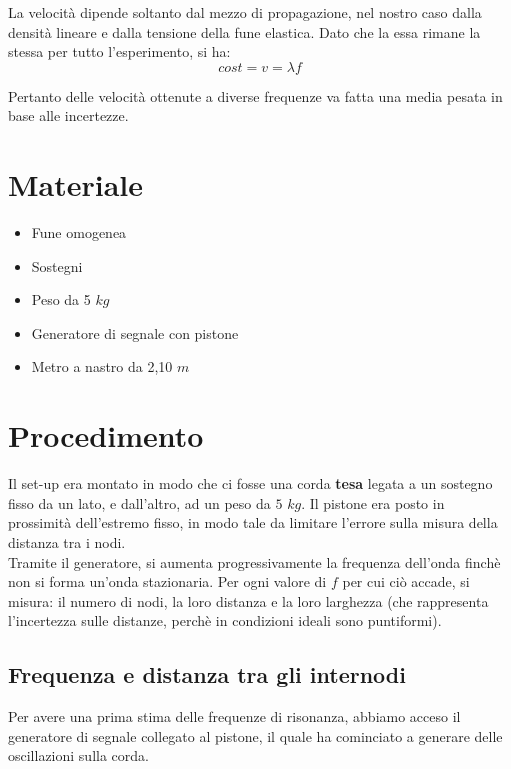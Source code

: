 \documentclass[12pt, a4paper]{article}
\begin{document}
La velocità dipende soltanto dal mezzo di propagazione, nel nostro caso dalla densità lineare e dalla tensione della fune elastica. Dato che la essa rimane la stessa per tutto l'esperimento, si ha:
\begin{equation*}
    cost = v = \lambda f
\end{equation*}

Pertanto delle velocità ottenute a diverse frequenze va fatta una media pesata in base alle incertezze.





\newpage
\section{Materiale}
\begin{itemize}
\setlength\itemsep{0mm}
    \item Fune omogenea
    \item Sostegni
    \item Peso da 5 $kg$
    \item Generatore di segnale con pistone
    \item Metro a nastro da 2,10 $m$
\end{itemize}




\section{Procedimento}
Il set-up era montato in modo che ci fosse una corda \textbf{tesa} legata a un sostegno fisso da un lato, e dall'altro, ad un peso da $5$ $kg$. Il pistone era posto in prossimità  dell'estremo fisso, in modo tale da limitare l'errore sulla misura della distanza tra i  nodi.\\
Tramite il generatore, si aumenta progressivamente la frequenza dell'onda finchè non si forma un'onda stazionaria. Per ogni valore di $f$ per cui ciò accade, si misura: il numero di nodi, la loro distanza e la loro larghezza (che rappresenta l'incertezza sulle distanze, perchè in condizioni ideali sono puntiformi).




  
\subsection{Frequenza e distanza tra gli internodi}
Per avere una prima stima delle frequenze di risonanza, abbiamo acceso il generatore di segnale collegato al pistone, il quale ha cominciato a generare delle oscillazioni sulla corda. 
\bigskip
\end{document}
